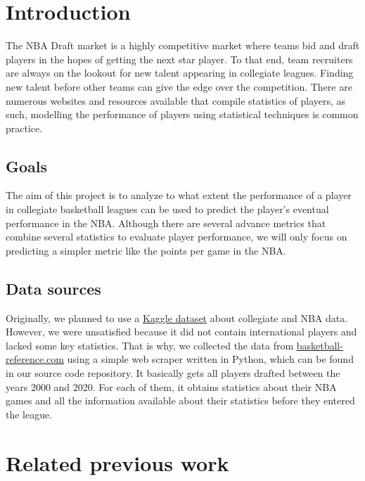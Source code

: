 
\section{Introduction}%
\label{sec:introduction}

The NBA Draft market is a highly competitive market where teams bid and draft
players in the hopes of getting the next star player. To that end, team
recruiters are always on the lookout for new talent appearing in collegiate
leagues. Finding new talent before other teams can give the edge over the
competition. There are numerous websites and resources available that compile
statistics of players, as such, modelling the performance of players using
statistical techniques is common practice.

\subsection{Goals}%
\label{sub:goals}

The aim of this project is to analyze to what extent the performance of a player
in collegiate basketball leagues can be used to predict the player's eventual
performance in the NBA. Although there are several advance metrics that combine several
statistics to evaluate player performance, we will only focus on
predicting a simpler metric like the points per game in the NBA.

\subsection{Data sources}%
\label{sub:data-sources}

Originally, we planned to use a \href{https://www.kaggle.com/datasets/adityak2003/college-basketball-players-20092021}{Kaggle dataset} about collegiate and NBA data. However, we were unsatisfied because it did not contain international players and lacked some key statistics. That is why, we collected the data from \href{http://www.basketball-reference.com}{basketball-reference.com} using a simple web scraper written in Python, which can be found in our source code repository. It basically gets all players drafted between the years 2000 and 2020. For each of them, it obtains statistics about their NBA games and all the information available about their statistics before they entered the league.

\section{Related previous work}%
\label{sec:previous-work}

